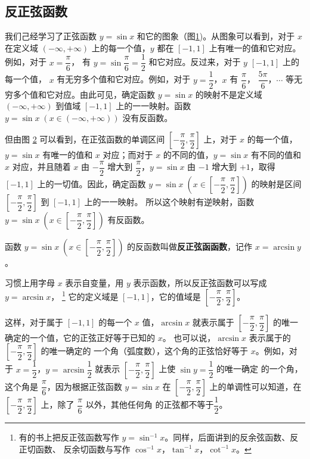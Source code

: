 \subsection{反正弦函数}\label{subsec:1-1}

我们己经学习了正弦函数 $y = \sin x$ 和它的图象（图\ref{fig:1-1})。从图象可以看到，对于 $x$ 在定义域
$(-\infty, +\infty)$ 上的每一个值，$y$ 都在 $[-1, 1]$ 上有唯一的值和它对应。例如，对于 $x = \dfrac{\pi}{6}$，
有 $y = \sin\dfrac{\pi}{6} = \dfrac{1}{2}$ 和它对应。反过来，对于 $y$ $[-1, 1]$ 上的每一个值，
$x$ 有无穷多个值和它对应。例如，对于 $y = \dfrac{1}{2}$，$x$ 有 $\dfrac{\pi}{6}$，
$\dfrac{5\pi}{6}$，$\cdots$ 等无穷多个值和它对应。由此可见，确定函数 $y = \sin x$ 的映射不是定义域 $(-\infty, +\infty)$
到值域 $[-1, 1]$ 上的一一映射。函数 $y = \sin x \; (x \in (-\infty, +\infty))$ 没有反函数。

\begin{figure}[htbp]
    \centering
    
    \caption{}\label{fig:1-1}
\end{figure}

但由图 \ref{fig:1-2} 可以看到，在正弦函数的单调区间 $\left[ -\dfrac{\pi}{2}, \dfrac{\pi}{2} \right]$
上，对于 $x$ 的每一个值，$y = \sin x$ 有唯一的值和 $x$ 对应；而对于 $x$ 的不同的值，$y = \sin x$
有不同的值和 $x$ 对应，并且随着 $x$ 由 $-\dfrac{\pi}{2}$ 增大到 $\dfrac{\pi}{2}$，$y = \sin x$
由 $-1$ 增大到 $+1$，取得 $[-1, 1]$ 上的一切值。因此，确定函数
$y = \sin x \; \left( x \in \left[ -\dfrac{\pi}{2}, \dfrac{\pi}{2} \right]\right)$
的映射是区间 $\left[ -\dfrac{\pi}{2}, \dfrac{\pi}{2} \right]$ 到 $[-1, 1]$ 上的一一映射。
所以这个映射有逆映射，函数
$y = \sin x \; \left( x \in \left[ -\dfrac{\pi}{2}, \dfrac{\pi}{2} \right]\right)$
有反函数。

\begin{figure}[htbp]
    \centering
    
    \caption{}\label{fig:1-2}
\end{figure}

函数
$y = \sin x \; \left( x \in \left[ -\dfrac{\pi}{2}, \dfrac{\pi}{2} \right]\right)$
的反函数叫做\textbf{反正弦函函数}，记作 $x = \arcsin y$。

\newpage
习惯上用字母 $x$ 表示自变量，用 $y$ 表示函数，所以反正弦函数可以写成 $y = \arcsin x$，
\footnote{有的书上把反正弦函数写作 $y = \sin^{-1}x$。同样，后面讲到的反余弦函数、反正切函数、
反余切函数与写作 $\cos^{-1}x$，$\tan^{-1}x$，$\cot^{-1}x$。}
它的定义域是 $[-1, 1]$，它的值域是 $\left[ -\dfrac{\pi}{2}, \dfrac{\pi}{2} \right]$。

这样，对于属于 $[-1, 1]$ 的每一个 $x$ 值，$\arcsin x$ 就表示属于
$\left[ -\dfrac{\pi}{2}, \dfrac{\pi}{2} \right]$ 的唯一确定的一个值，它的正弦正好等于已知的 $x$。
也可以说，$\arcsin x$ 表示属于的 $\left[ -\dfrac{\pi}{2}, \dfrac{\pi}{2} \right]$ 的唯一确定的
一个角（弧度数），这个角的正弦恰好等于 $x$。例如，对于 $x = \dfrac{1}{2}$，$y = \arcsin \dfrac{1}{2}$
就表示 $\left[ -\dfrac{\pi}{2}, \dfrac{\pi}{2} \right]$ 上使 $\sin y = \dfrac{1}{2}$ 的唯一确定
的一个角，这个角是 $\dfrac{\pi}{6}$，因为根据正弦函数 $y = \sin x$ 在
$\left[ -\dfrac{\pi}{2}, \dfrac{\pi}{2} \right]$ 上的单调性可以知道，在
$\left[ -\dfrac{\pi}{2}, \dfrac{\pi}{2} \right]$ 上，除了 $\dfrac{\pi}{6}$ 以外，其他任何角
的正弦都不等于$\dfrac{1}{2}$。


